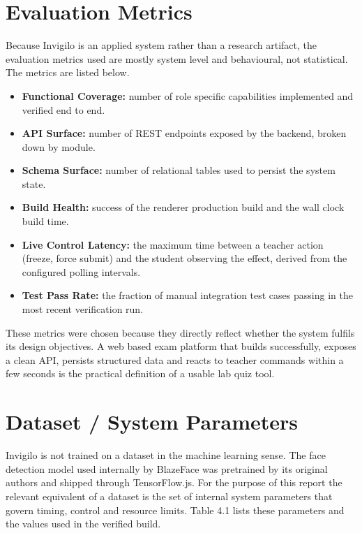\documentclass[12pt, a4paper]{report}
\begin{document}
\section{Evaluation Metrics}

\begin{justify}
  {\fontsize{12}{18}\selectfont
    Because Invigilo is an applied system rather than a research artifact, the evaluation metrics used are mostly system level and behavioural, not statistical. The metrics are listed below.

    \begin{itemize}
        \item \textbf{Functional Coverage:} number of role specific capabilities implemented and verified end to end.
        \item \textbf{API Surface:} number of REST endpoints exposed by the backend, broken down by module.
        \item \textbf{Schema Surface:} number of relational tables used to persist the system state.
        \item \textbf{Build Health:} success of the renderer production build and the wall clock build time.
        \item \textbf{Live Control Latency:} the maximum time between a teacher action (freeze, force submit) and the student observing the effect, derived from the configured polling intervals.
        \item \textbf{Test Pass Rate:} the fraction of manual integration test cases passing in the most recent verification run.
    \end{itemize}

    These metrics were chosen because they directly reflect whether the system fulfils its design objectives. A web based exam platform that builds successfully, exposes a clean API, persists structured data and reacts to teacher commands within a few seconds is the practical definition of a usable lab quiz tool.
  }
\end{justify}

\section{Dataset / System Parameters}

\begin{justify}
  {\fontsize{12}{18}\selectfont
    Invigilo is not trained on a dataset in the machine learning sense. The face detection model used internally by BlazeFace was pretrained by its original authors and shipped through TensorFlow.js. For the purpose of this report the relevant equivalent of a dataset is the set of internal system parameters that govern timing, control and resource limits. Table 4.1 lists these parameters and the values used in the verified build.
  }
\end{justify}
\end{document}
